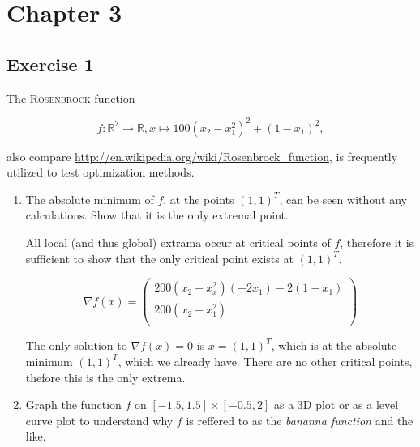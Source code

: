 \documentclass[11pt,oneside]{extarticle}
\newcommand{\Real}{\mathbb{R}}
\begin{document}
\section{Chapter 3}

\subsection{Exercise 1}

The \textsc{Rosenbrock} function

$$
f:\Real^2 \rightarrow \Real, x \mapsto 100(x_2-x_1^2)^2 + (1-x_1)^2,
$$

also compare \url{http://en.wikipedia.org/wiki/Rosenbrock_function}, is frequently
utilized to test optimization methods.

\begin{enumerate}

    \item The absolute minimum of $f$, at the points $(1,1)^T$, can be seen 
        without any calculations. Show that it is the only extremal point.

    All local (and thus global) extrama occur at critical points of $f$, therefore
    it is sufficient to show that the only critical point exists at $(1,1)^T$.

    $$\nabla f(x)=\begin{pmatrix}
        200(x_2 - x_x^2 ) (-2x_1) - 2(1-x_1) \\
        200(x_2-x_1^2) \\
    \end{pmatrix}$$

    The only solution to $\nabla f(x) = 0$ is $x=(1,1)^T$, which is at the
    absolute minimum $(1,1)^T$, which we already have. There are no other critical
    points, thefore this is the only extrema.

    \item Graph the function $f$ on $[-1.5,1.5]\times [-0.5,2]$ as a 3D plot or
        as a level curve plot to understand why $f$ is reffered to as the
        \emph{bananna function} and the like.


\end{enumerate}
\end{document}

